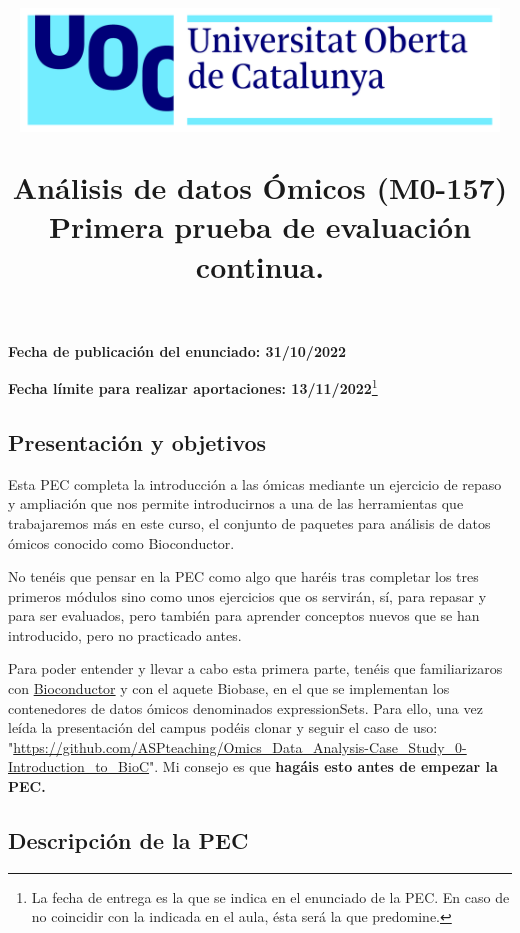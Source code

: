 \documentclass[
  letterpaper,
  DIV=11,
  numbers=noendperiod]{scrartcl}
\title{\includegraphics[width=5in,height=\textheight]{images/uoc_masterbrand_2linies_positiu.png}

Análisis de datos Ómicos (M0-157) Primera prueba de evaluación
continua.}
\author{}
\date{}
\begin{document}
\maketitle
\ifdefined\Shaded\renewenvironment{Shaded}{\begin{tcolorbox}[boxrule=0pt, frame hidden, borderline west={3pt}{0pt}{shadecolor}, enhanced, interior hidden, sharp corners, breakable]}{\end{tcolorbox}}\fi

\textbf{Fecha de publicación del enunciado: 31/10/2022}

\textbf{Fecha límite para realizar aportaciones: 13/11/2022}\footnote{La
  fecha de entrega es la que se indica en el enunciado de la PEC. En
  caso de no coincidir con la indicada en el aula, ésta será la que
  predomine.}

\hypertarget{presentaciuxf3n-y-objetivos}{%
\subsection{Presentación y
objetivos}\label{presentaciuxf3n-y-objetivos}}

Esta PEC completa la introducción a las ómicas mediante un ejercicio de
repaso y ampliación que nos permite introducirnos a una de las
herramientas que trabajaremos más en este curso, el conjunto de paquetes
para análisis de datos ómicos conocido como Bioconductor.

No tenéis que pensar en la PEC como algo que haréis tras completar los
tres primeros módulos sino como unos ejercicios que os servirán, sí,
para repasar y para ser evaluados, pero también para aprender conceptos
nuevos que se han introducido, pero no practicado antes.

Para poder entender y llevar a cabo esta primera parte, tenéis que
familiarizaros con \href{http://bioconductor.org}{Bioconductor} y con el
aquete Biobase, en el que se implementan los contenedores de datos
ómicos denominados expressionSets. Para ello, una vez leída la
presentación del campus podéis clonar y seguir el caso de uso:
"\url{https://github.com/ASPteaching/Omics_Data_Analysis-Case_Study_0-Introduction_to_BioC}".
Mi consejo es que \textbf{hagáis esto antes de empezar la PEC.}

\hypertarget{descripciuxf3n-de-la-pec}{%
\subsection{Descripción de la PEC}\label{descripciuxf3n-de-la-pec}}
\end{document}

